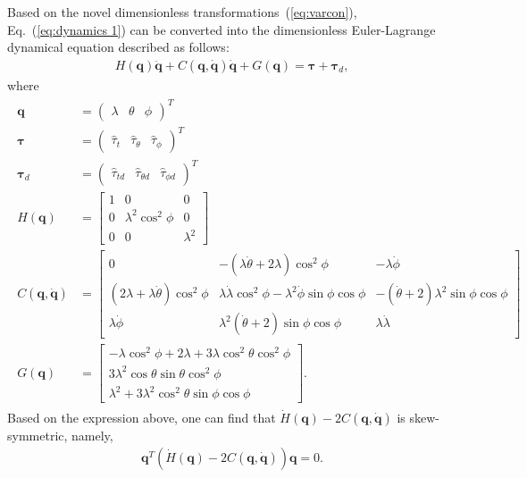 \documentclass[3p]{elsarticle}
\theoremstyle{plain}
\theoremstyle{remark}
\begin{document}
Based on the novel dimensionless transformations~(\ref{eq:varcon}), Eq.~(\ref{eq:dynamics 1}) can be converted into the dimensionless Euler-Lagrange dynamical equation described as follows:
\begin{align}
H(\bm q)\ddot {\bm q}+C(\bm q,\dot{\bm q})\dot{\bm q}+G(\bm q) = \bm\tau+\bm\tau_d,\label{eq:dynamic model}
\end{align}
where
\begin{align}
\begin{split}
\bm q&= \begin{pmatrix}\lambda&\theta&\phi\end{pmatrix}^T\\
\bm \tau&=\begin{pmatrix}\hat\tau_t&\hat\tau_\theta&\hat\tau_\phi\end{pmatrix}^T\\
\bm\tau_d&=\begin{pmatrix}\hat\tau_{td}&\hat\tau_{\theta d}&\hat\tau_{\phi d}\end{pmatrix}^T\\
H(\bm q) &= \begin{bmatrix}1 &0&0\\0 &\lambda^2\cos^2\phi&0\\0&0&\lambda^2\end{bmatrix}\\
C(\bm q,\dot{\bm q}) &=\begin{bmatrix}0 &-(\lambda\dot \theta+2\lambda)\cos^2\phi&-\lambda\dot\phi\\(2\lambda+\lambda\dot \theta)\cos^2\phi&\lambda\dot \lambda\cos^2\phi-\lambda^2\dot\phi\sin\phi\cos\phi&-(\dot\theta+2)\lambda^2\sin\phi\cos\phi\\ \lambda\dot\phi&\lambda^2(\dot\theta+2)\sin\phi\cos\phi&\lambda\dot \lambda\end{bmatrix}\\
G(\bm q) &=\begin{bmatrix}-\lambda\cos^2\phi+2\lambda+3\lambda\cos ^2\theta\cos^2\phi\\3\lambda^2\cos\theta\sin\theta\cos^2\phi\\\lambda^2+3\lambda^2\cos^2\theta\sin\phi\cos\phi\end{bmatrix}.
\end{split}
\end{align}
Based on the expression above, one can find that $\dot H(\bm q) - 2C(\bm q,\dot{\bm q})$ is skew-symmetric, namely,
\begin{align}
\bm q^T(\dot H(\bm q) - 2C(\bm q,\dot{\bm q}))\bm q = 0.
\end{align}
\end{document}
